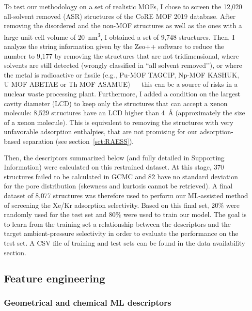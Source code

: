 \documentclass[main]{subfiles}
\begin{document}
To test our methodology on a set of realistic MOFs, I chose to screen the 12,020 all-solvent removed (ASR) structures of the CoRE MOF 2019 database\autocite{Chung_2019}. After removing the disordered and the non-MOF structures as well as the ones with a large unit cell volume of \SI{20}{\cubic\nano\meter}, I obtained a set of 9,748 structures. Then, I analyze the string information given by the Zeo++ software\autocite{zeopp_Willems2012} to reduce the number to 9,177 by removing the structures that are not tridimensional, where solvents are still detected (wrongly classified in ``all solvent removed’’), or where the metal is radioactive or fissile (e.g., Pu-MOF TAGCIP\autocite{Diwu_2010}, Np-MOF KASHUK\autocite{Martin_2017}, U-MOF ABETAE\autocite{Jouffret_2011} or Th-MOF ASAMUE\autocite{Liang_2016}) --- this can be a source of risks in a nuclear waste processing plant. Furthermore, I added a condition on the largest cavity diameter (LCD) to keep only the structures that can accept a xenon molecule: 8,529 structures have an LCD higher than \SI{4}{\angstrom} (approximately the size of a xenon molecule). This is equivalent to removing the structures with very unfavorable adsorption enthalpies, that are not promising for our adsorption-based separation (see section~\ref{sct:RAESS}).

Then, the descriptors summarized below (and fully detailed in Supporting Information) were calculated on this restrained dataset. At this stage, 370 structures failed to be calculated in GCMC and 82 have no standard deviation for the pore distribution (skewness and kurtosis cannot be retrieved). A final dataset of 8,077 structures was therefore used to perform our ML-assisted method of screening the Xe/Kr adsorption selectivity. Based on this final set, {20\%} were randomly used for the test set and {80\%} were used to train our model. The goal is to learn from the training set a relationship between the descriptors and the target ambient-pressure selectivity in order to evaluate the performance on the test set. A CSV file of training and test sets can be found in the data availability section.

\subsection{Feature engineering}

\subsubsection{Geometrical and chemical ML descriptors}
\end{document}
